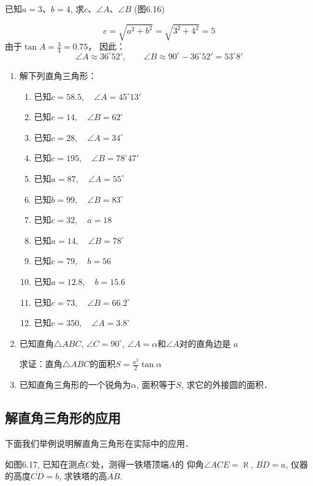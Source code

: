 \begin{example}
    已知$a=3$、$b=4$, 求$c$、$\angle A$、$\angle B$ (图6.16)
\end{example}

\begin{solution}
\[c=\sqrt{a^2+b^2}=\sqrt{3^2+4^2}=5\]
由于$\tan A=\frac{3}{4}=0.75$，
因此：$$\angle A\approx 36^{\circ} 52',\qquad 
\angle B\approx 90^{\circ} -36^{\circ} 52'=53^{\circ} 8'$$ 
\end{solution}

\begin{ex}
\begin{enumerate}
    \item 解下列直角三角形：
    \begin{enumerate}
    \item 已知$c=58.5,\quad \angle A=45^{\circ} 13'$
    \item 已知$c=14,\quad \angle B=62^{\circ}$
    \item 已知$c=28,\quad \angle A=34^{\circ} $
    \item 已知$c=195,\quad \angle B=78^{\circ} 47'$
    \item 已知$a=87,\quad \angle A=55^{\circ} $
    \item 已知$b=99,\quad \angle B=83^{\circ} $
    \item 已知$c=32,\quad a=18$
    \item 已知$a=14,\quad \angle B=78^{\circ}$
    \item 已知$c=79,\quad b=56$
    \item 已知$a=12.8,\quad b=15.6$
    \item 已知$c=73,\quad \angle B=66.2^{\circ}$ 
    \item 已知$c=350,\quad \angle A=3.8^{\circ} $
\end{enumerate}

\item 已知直角$\triangle ABC$, $\angle C=90^{\circ}$, $\angle A=\alpha$和$\angle A$对的直角边是
$a$

求证：直角$\triangle ABC$的面积$S=\frac{a^2}{2}\tan\alpha$

\item  已知直角三角形的一个锐角为$\alpha$, 面积等于$S$, 
求它的外接圆的面积．
\end{enumerate}
\end{ex}

\subsection{解直角三角形的应用}
下面我们举例说明解直角三角形在实际中的应用．
\begin{example}
如图6.17, 已知在测点$C$处，测得一铁塔顶端$A$的
仰角$\angle ACE=\aleph$, $\overline{BD}=a$, 仪器的高度$\overline{CD}=b$, 求铁塔的高$\overline{AB}$.

\end{example}


